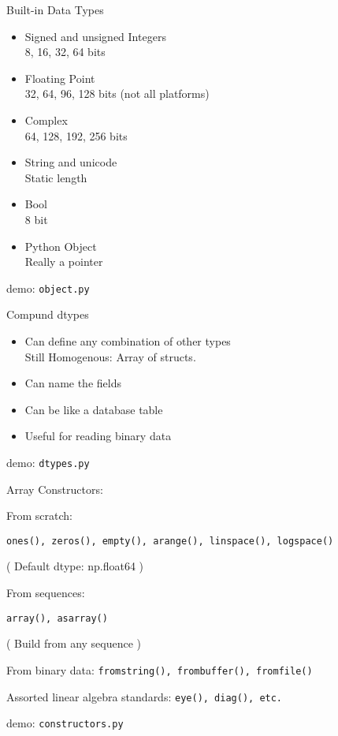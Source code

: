 \documentclass{beamer}
\begin{document}
\begin{frame}[fragile]{Built-in Data Types}

\begin{itemize}
  \item Signed and unsigned Integers\\
        8, 16, 32, 64 bits
  \item Floating Point\\
        32, 64, 96, 128 bits (not all platforms)
  \item Complex\\
        64, 128, 192, 256 bits
  \item String and unicode\\
        Static length 
  \item Bool \\
        8 bit
  \item Python Object \\
        Really a pointer
\end{itemize}

\vfill
{\large demo: \verb|object.py|}

\end{frame} 

\begin{frame}[fragile]{Compund dtypes}

{\Large
\begin{itemize}
  \item Can define any combination of other types \\
        Still Homogenous:  Array of structs.
  \item Can name the fields
  \item Can be like a database table
  \item Useful for reading binary data
\end{itemize}
}

\vfill
{\Large demo: \verb|dtypes.py|}

\end{frame} 

\begin{frame}[fragile]{Array Constructors:}

{\Large From scratch:}

\verb|ones(), zeros(), empty(), arange(), linspace(), logspace()|

( Default dtype: np.float64 )


\vfill
{\Large From sequences:}

\verb|array(), asarray()|

( Build from any sequence )

\vfill
{\Large  From binary data:}
\verb|fromstring(), frombuffer(), fromfile()|

\vfill
{\Large Assorted linear algebra standards:}
\verb|eye(), diag(), etc.| 

\vfill
{\large demo: \verb|constructors.py|}
\end{frame} 
\end{document}
